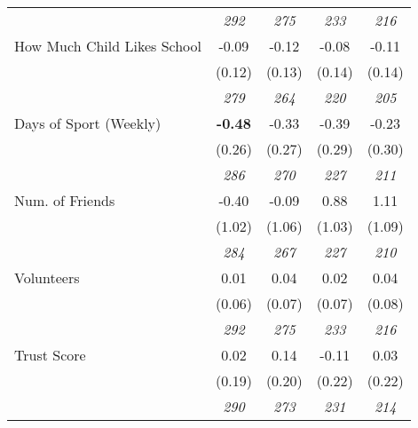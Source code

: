 \begin{tabular}{l c c c c}
& \textit{ 292 } & \textit{ 275 } & \textit{ 233 } & \textit{ 216 } \\
How Much Child Likes School & -0.09 & -0.12 & -0.08 & -0.11 \\
& (0.12) & (0.13) & (0.14) & (0.14) \\
& \textit{ 279 } & \textit{ 264 } & \textit{ 220 } & \textit{ 205 } \\
Days of Sport (Weekly) & \textbf{ -0.48 } & -0.33 & -0.39 & -0.23 \\
& (0.26) & (0.27) & (0.29) & (0.30) \\
& \textit{ 286 } & \textit{ 270 } & \textit{ 227 } & \textit{ 211 } \\
Num. of Friends & -0.40 & -0.09 & 0.88 & 1.11 \\
& (1.02) & (1.06) & (1.03) & (1.09) \\
& \textit{ 284 } & \textit{ 267 } & \textit{ 227 } & \textit{ 210 } \\
Volunteers & 0.01 & 0.04 & 0.02 & 0.04 \\
& (0.06) & (0.07) & (0.07) & (0.08) \\
& \textit{ 292 } & \textit{ 275 } & \textit{ 233 } & \textit{ 216 } \\
Trust Score & 0.02 & 0.14 & -0.11 & 0.03 \\
& (0.19) & (0.20) & (0.22) & (0.22) \\
& \textit{ 290 } & \textit{ 273 } & \textit{ 231 } & \textit{ 214 } \\
\bottomrule
\end{tabular}
